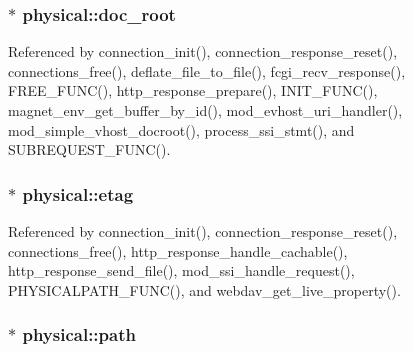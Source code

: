 \hypertarget{structphysical_a98672acc301e5fb96e694eadca486234}{
\subsubsection[{doc\-\_\-root}]{$\ast$ physical\-::doc\-\_\-root}}\label{structphysical_a98672acc301e5fb96e694eadca486234}


Referenced by connection\-\_\-init(), connection\-\_\-response\-\_\-reset(), connections\-\_\-free(), deflate\-\_\-file\-\_\-to\-\_\-file(), fcgi\-\_\-recv\-\_\-response(), F\-R\-E\-E\-\_\-\-F\-U\-N\-C(), http\-\_\-response\-\_\-prepare(), I\-N\-I\-T\-\_\-\-F\-U\-N\-C(), magnet\-\_\-env\-\_\-get\-\_\-buffer\-\_\-by\-\_\-id(), mod\-\_\-evhost\-\_\-uri\-\_\-handler(), mod\-\_\-simple\-\_\-vhost\-\_\-docroot(), process\-\_\-ssi\-\_\-stmt(), and S\-U\-B\-R\-E\-Q\-U\-E\-S\-T\-\_\-\-F\-U\-N\-C().

\hypertarget{structphysical_a9fbba28b809c3d23be048f38a0a157e8}{
\subsubsection[{etag}]{$\ast$ physical\-::etag}}\label{structphysical_a9fbba28b809c3d23be048f38a0a157e8}


Referenced by connection\-\_\-init(), connection\-\_\-response\-\_\-reset(), connections\-\_\-free(), http\-\_\-response\-\_\-handle\-\_\-cachable(), http\-\_\-response\-\_\-send\-\_\-file(), mod\-\_\-ssi\-\_\-handle\-\_\-request(), P\-H\-Y\-S\-I\-C\-A\-L\-P\-A\-T\-H\-\_\-\-F\-U\-N\-C(), and webdav\-\_\-get\-\_\-live\-\_\-property().

\hypertarget{structphysical_ab8904c540bcd84c8a18ec85ab198910d}{
\subsubsection[{path}]{$\ast$ physical\-::path}}\label{structphysical_ab8904c540bcd84c8a18ec85ab198910d}


